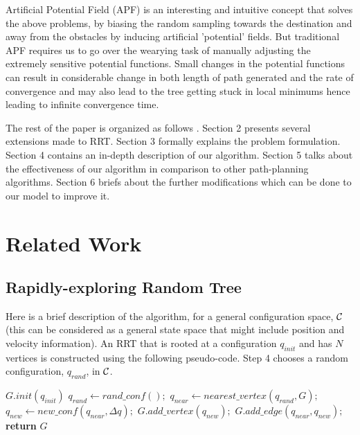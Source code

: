 \documentclass[runningheads]{llncs}
\begin{document}
Artificial Potential Field (APF) is an interesting and intuitive concept that solves the above problems, by biasing the random sampling towards the destination and away from the obstacles by inducing artificial 'potential' fields. But traditional APF requires us to go over the wearying task of manually adjusting the extremely sensitive potential functions. Small changes in the potential functions can result in considerable change in both length of path generated and the rate of convergence and may also lead to the tree getting stuck in local minimums hence leading to infinite convergence time. 

The rest of the paper is organized as follows . Section 2  presents several extensions made to RRT. Section 3 formally explains the problem formulation. Section 4 contains an in-depth description of our algorithm. Section 5 talks about the effectiveness of our algorithm in comparison to other path-planning algorithms. Section 6 briefs about the further modifications which can be done to our model to improve it.
\vspace{-2mm}  
\section{{Related Work}}

\subsection{Rapidly-exploring Random Tree}
Here is a brief description of the algorithm, for a general configuration space, ${\cal C}$ (this can be considered as a general state space that might include position and velocity information). An RRT that is rooted at a configuration $q_{init}$ and has $N$ vertices is constructed using the following pseudo-code. 
Step 4 chooses a random configuration, $q_{rand}$, in ${\cal C}$.


\begin{algorithm}
\caption{RRT algorithm}\label{RRT}
\begin{algorithmic}[1]
\State $G.init(q_{init})$
\State $q_{rand}\gets rand\_conf();$
\State $q_{near}\gets nearest\_vertex(q_{rand}, G);$
\State $q_{new}\gets new\_conf(q_{near}, \Delta q);$
\State $G.add\_vertex(q_{new});$
\State $G.add\_edge(q_{near},q_{new});$
\EndIf
\EndFor
\State \textbf{return} $G$
\EndProcedure
\end{algorithmic}
\end{algorithm}
\end{document}
